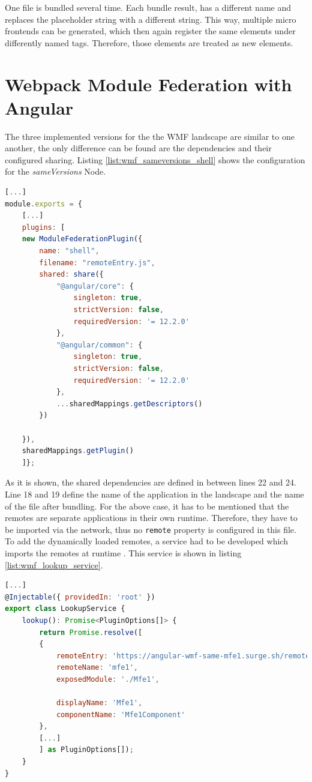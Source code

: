 One file is bundled several time. Each bundle result, has a different name and replaces the placeholder string with a different string. This way, multiple micro frontends can be generated, which then again register the same elements under differently named tags. Therefore, those elements are treated as new elements.

\section{Webpack Module Federation with Angular} 
\label{wmf_implementation_prototype}

The three implemented versions for the the WMF landscape are similar to one another, the only difference can be found are the dependencies and their configured sharing. Listing \ref{list:wmf_sameversions_shell} shows the configuration for the \textit{sameVersions} Node.

\begin{lstlisting}[language=JavaScript, caption=Content of \texttt{webpack.config.js} of the shell of the sameVersions WMF project, label=list:wmf_sameversions_shell, xleftmargin=.0\textwidth, xrightmargin=.0\textwidth]
[...]
module.exports = {
	[...]
	plugins: [
	new ModuleFederationPlugin({
		name: "shell",
		filename: "remoteEntry.js",
		shared: share({
			"@angular/core": { 
				singleton: true, 
				strictVersion: false, 
				requiredVersion: '= 12.2.0'
			},
			"@angular/common": { 
				singleton: true, 
				strictVersion: false, 
				requiredVersion: '= 12.2.0' 
			},
			...sharedMappings.getDescriptors()
		})
		
	}),
	sharedMappings.getPlugin()
	]};
\end{lstlisting}

As it is shown, the shared dependencies are defined in between lines 22 and 24. Line 18 and 19 define the name of the application in the landscape and the name of the file after bundling. For the above case, it has to be mentioned that the remotes are separate applications in their own runtime. Therefore, they have to be imported via the network, thus no \texttt{remote} property is configured in this file. To add the dynamically loaded remotes, a service had to be developed which imports the remotes at runtime \cite{wmf_angular_dynamicfederation}. This service is shown in listing \ref{list:wmf_lookup_service}.

\begin{lstlisting}[language=JavaScript, caption=Content of \texttt{lookup.service.ts} for remote module loading in shell applications, label=list:wmf_lookup_service,  xleftmargin=.0\textwidth, xrightmargin=.0\textwidth]
[...]
@Injectable({ providedIn: 'root' })
export class LookupService {
	lookup(): Promise<PluginOptions[]> {
		return Promise.resolve([
		{
			remoteEntry: 'https://angular-wmf-same-mfe1.surge.sh/remoteEntry.js',
			remoteName: 'mfe1',
			exposedModule: './Mfe1',
			
			displayName: 'Mfe1',
			componentName: 'Mfe1Component'
		},
		[...]	
		] as PluginOptions[]);
	}
}
\end{lstlisting}

